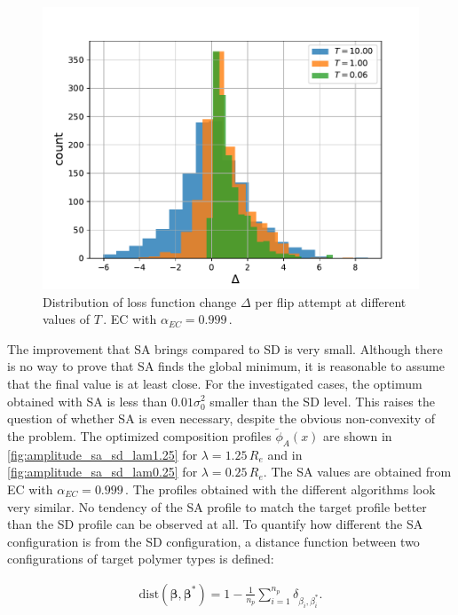 \documentclass[bachelor,       %
               oneside,        %
               BCOR10mm,       %
               ngerman, english %
               ]{GAUBM}
\begin{document}
\begin{figure}[h]
    \centering
    \includegraphics[width=\textwidth]{figures/delta_loss_hist_ec.pdf}
    \caption{Distribution of loss function change $\Delta$ per flip attempt at different values of $T\,.$ \ac{EC} with $\alpha_{EC}=0.999\,.$}
    \label{fig:delta_loss_hist}
\end{figure}


The improvement that \ac{SA} brings compared to \ac{SD} is very small. Although there is no way to prove that \ac{SA} finds the global minimum, it is reasonable to assume that the final value is at least close. For the investigated cases, the optimum obtained with \ac{SA} is less than $0.01\sigma_0^2$ smaller than the \ac{SD} level. This raises the question of whether \ac{SA} is even necessary, despite the obvious non-convexity of the problem. The optimized composition profiles $\tilde\phi_A(x)$ are shown in \autoref{fig:amplitude_sa_sd_lam1.25} for $\lambda=1.25\,R_e$ and in \autoref{fig:amplitude_sa_sd_lam0.25} for $\lambda=0.25\,R_e$. The \ac{SA} values are obtained from \ac{EC} with $\alpha_{EC}=0.999\,.$ The profiles obtained with the different algorithms look very similar. No tendency of the \ac{SA} profile to match the target profile better than the \ac{SD} profile can be observed at all. To quantify how different the \ac{SA} configuration is from the \ac{SD} configuration, a distance function between two configurations of target polymer types is defined:

\begin{align}
    \mathrm{dist}(\pmb\beta,\pmb\beta^*)=1-\frac{1}{n_p}\sum_{i=1}^{n_p}\delta_{\beta_i,\beta_i^*}.
\end{align}
\end{document}
